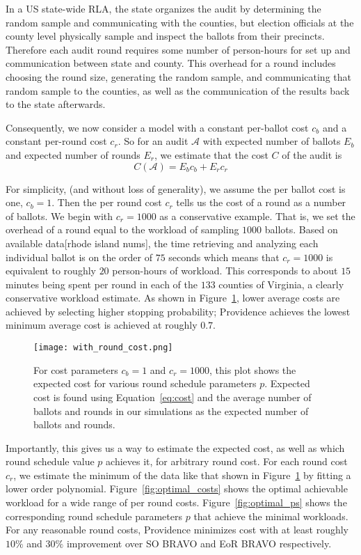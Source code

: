 In a US state-wide RLA, the state organizes the audit by determining the random sample and communicating with the counties, but election officials at the county level physically sample and inspect the ballots from their precincts. 
Therefore each audit round requires some number of person-hours for set up and communication between state and county. This overhead for a round includes choosing the round size, generating the random sample, and communicating that random sample to the counties, as well as the communication of the results back to the state afterwards. 

Consequently, we now consider a model with a constant per-ballot cost $c_b$ and a constant per-round cost $c_r$.
So for an audit $\mathcal{A}$ with expected number of ballots $E_{b}$ and expected number of rounds $E_{r}$, we estimate that the cost $C$ of the audit is
\begin{equation}
C(\mathcal{A}) = E_b c_b + E_r c_r
\label{eq:round_cost}
\end{equation}

For simplicity, (and without loss of generality), we assume the per ballot cost is one, $c_b=1$. Then the per round cost $c_r$ tells us the cost of a round as a number of ballots. We begin with $c_r=1000$ as a conservative example. 
That is, we set the overhead of a round equal to the workload of sampling $1000$ ballots. Based on available data[rhode island nums], the time retrieving and analyzing each individual ballot is on the order of $75$ seconds which means that $c_r=1000$ is equivalent to roughly $20$ person-hours of workload. This corresponds to about $15$ minutes being spent per round in each of the $133$ counties of Virginia, a clearly conservative workload estimate. 
As shown in Figure~\ref{fig:with_round_cost}, lower average costs are achieved by selecting higher stopping probability; Providence achieves the lowest minimum average cost is achieved at roughly $0.7$.

\begin{figure}
\texttt{[image: with\_round\_cost.png]}
\caption{For cost parameters $c_b=1$ and $c_r=1000$, this plot shows the expected cost for various round schedule parameters $p$. Expected cost is found using Equation~\ref{eq:cost} and the average number of ballots and rounds in our simulations as the expected number of ballots and rounds.}
\label{fig:with_round_cost}
\end{figure}

Importantly, this gives us a way to estimate the expected cost, as well as which round schedule value $p$ achieves it, for arbitrary round cost. For each round cost $c_r$, we estimate the minimum of the data like that shown in Figure~\ref{fig:with_round_cost} by fitting a lower order polynomial.
Figure~\ref{fig:optimal_costs} shows the optimal achievable workload for a wide range of per round costs. Figure~\ref{fig:optimal_ps} shows the corresponding round schedule parameters $p$ that achieve the minimal workloads. For any reasonable round costs, Providence minimizes cost with at least roughly $10\%$ and $30\%$ improvement over SO BRAVO and EoR BRAVO respectively.

